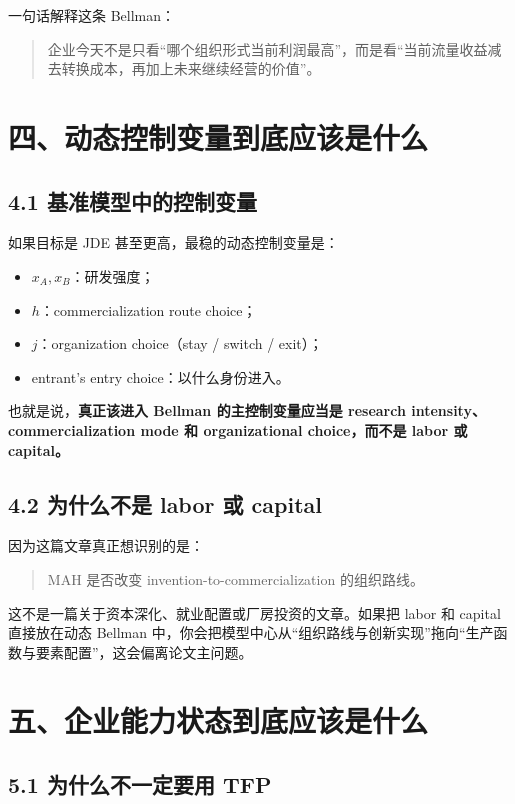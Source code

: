\documentclass[12pt]{ctexart}
\begin{document}
一句话解释这条 Bellman：

\begin{quote}
企业今天不是只看“哪个组织形式当前利润最高”，而是看“当前流量收益减去转换成本，再加上未来继续经营的价值”。
\end{quote}

\section{四、动态控制变量到底应该是什么}

\subsection{4.1 基准模型中的控制变量}

如果目标是 JDE 甚至更高，最稳的动态控制变量是：

\begin{itemize}[leftmargin=2em]
    \item \(x_A, x_B\)：研发强度；
    \item \(h\)：commercialization route choice；
    \item \(j\)：organization choice（stay / switch / exit）；
    \item entrant's entry choice：以什么身份进入。
\end{itemize}

也就是说，\textbf{真正该进入 Bellman 的主控制变量应当是 research intensity、commercialization mode 和 organizational choice，而不是 labor 或 capital。}

\subsection{4.2 为什么不是 labor 或 capital}

因为这篇文章真正想识别的是：

\begin{quote}
MAH 是否改变 invention-to-commercialization 的组织路线。
\end{quote}

这不是一篇关于资本深化、就业配置或厂房投资的文章。如果把 labor 和 capital 直接放在动态 Bellman 中，你会把模型中心从“组织路线与创新实现”拖向“生产函数与要素配置”，这会偏离论文主问题。

\section{五、企业能力状态到底应该是什么}

\subsection{5.1 为什么不一定要用 TFP}
\end{document}
